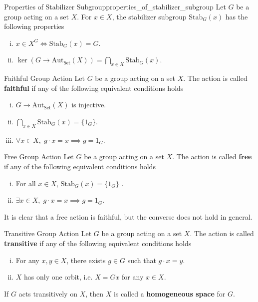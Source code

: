 \begin{proposition}{Properties of Stabilizer Subgroup}{properties_of_stabilizer_subgroup}
    Let $G$ be a group acting on a set $X$. For $x\in X$, the stabilizer subgroup $\mathrm{Stab}_G(x)$ has the following properties
    \begin{enumerate}[(i)]
        \item $x\in X^G\iff \mathrm{Stab}_G(x)=G$.
        \item $\ker \left(G\to \mathrm{Aut}_{\mathsf{Set}}(X)\right)=\bigcap\limits_{x\in X}\mathrm{Stab}_G(x)$.
    \end{enumerate}
\end{proposition}



\begin{definition}{Faithful Group Action}{}
    Let $G$ be a group acting on a set $X$. The action is called \textbf{faithful} if any of the following equivalent conditions holds
    \begin{enumerate}[(i)]
        \item $G\to \mathrm{Aut}_{\mathsf{Set}}(X)$ is injective.
        \item $\bigcap\limits_{x\in X}\mathrm{Stab}_G(x)=\{ 1_G\}$.
        \item $\forall x\in X,\;g\cdot x=x\implies g=1_G$.
    \end{enumerate}
\end{definition}


\begin{definition}{Free Group Action}{}
    Let $G$ be a group acting on a set $X$. The action is called \textbf{free} if any of the following equivalent conditions holds
    \begin{enumerate}[(i)]
        \item For all $x\in X$, $\mathrm{Stab}_G(x)=\{ 1_G\}$ .
        \item $\exists x\in X,\;g\cdot x=x\implies g=1_G$.
    \end{enumerate}
\end{definition}

It is clear that a free action is faithful, but the converse does not hold in general.

\begin{definition}{Transitive Group Action}{}
    Let $G$ be a group acting on a set $X$. The action is called \textbf{transitive} if any of the following equivalent conditions holds
    \begin{enumerate}[(i)]
        \item For any $x,y\in X$, there exists $g\in G$ such that $g\cdot x=y$.
        \item $X$ has only one orbit, i.e. $X= Gx$ for any $x\in X$.
    \end{enumerate}
    If $G$ acts transitively on $X$, then $X$ is called a \textbf{homogeneous space} for $G$.
\end{definition}

